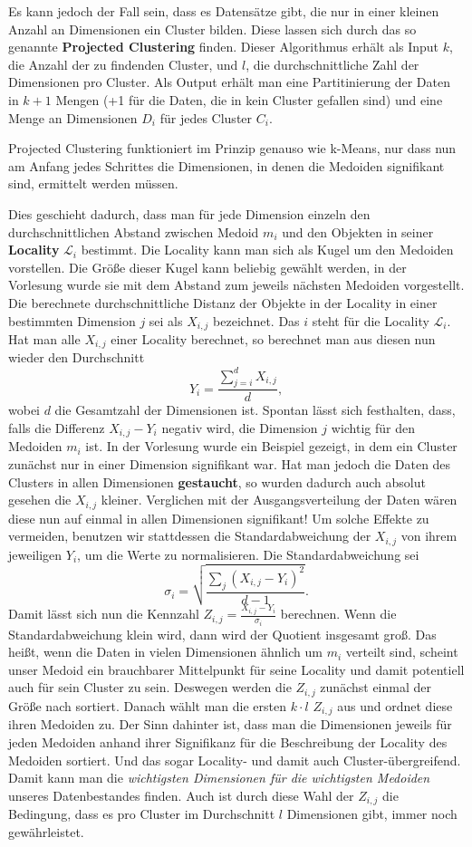 Es kann jedoch der Fall sein, dass es Datensätze gibt, die nur in einer kleinen
Anzahl an Dimensionen ein Cluster bilden. Diese lassen sich durch das so
genannte \textbf{Projected Clustering} finden. Dieser Algorithmus erhält
als Input \(k\), die Anzahl der zu findenden Cluster, und \(l\), die
durchschnittliche Zahl der Dimensionen pro Cluster. Als Output erhält man
eine Partitinierung der Daten in \(k+1\) Mengen (+1 für die Daten, die in
kein Cluster gefallen sind) und eine Menge an Dimensionen \(D_i\) für jedes
Cluster \(C_i\).

Projected Clustering funktioniert im Prinzip genauso wie k-Means, nur dass
nun am Anfang jedes Schrittes die Dimensionen, in denen die Medoiden 
signifikant sind, ermittelt werden müssen. 

Dies geschieht dadurch, dass man
für jede Dimension einzeln den durchschnittlichen Abstand zwischen Medoid
\(m_i\) und den Objekten in seiner \textbf{Locality} \(\mathcal{L}_i\)
bestimmt. Die Locality kann man sich als Kugel um den Medoiden vorstellen.
Die Größe dieser Kugel kann beliebig gewählt werden, in der Vorlesung wurde
sie mit dem Abstand zum jeweils nächsten Medoiden vorgestellt. Die berechnete
durchschnittliche Distanz der Objekte in der Locality
 in einer bestimmten Dimension \(j\) sei als \(X_{i,j}\) bezeichnet.
Das \(i\) steht für die Locality \(\mathcal{L}_i\). Hat man alle \(X_{i,j}\)
einer Locality berechnet, so berechnet man aus diesen nun wieder den 
Durchschnitt \[Y_i = \frac{\sum_{j=i}^d X_{i,j}}{d},\] wobei \(d\) die
Gesamtzahl der Dimensionen ist. Spontan lässt sich festhalten, dass, falls 
die Differenz
\(X_{i,j}-Y_i\) negativ wird, die Dimension \(j\) wichtig für den Medoiden
\(m_i\) ist. In der Vorlesung wurde ein Beispiel gezeigt, in dem ein Cluster
zunächst nur in einer Dimension signifikant war. Hat man jedoch die Daten
des Clusters in allen Dimensionen \textbf{gestaucht}, so wurden dadurch 
auch absolut 
gesehen die \(X_{i,j}\) kleiner. Verglichen mit der Ausgangsverteilung der
Daten wären diese nun auf einmal in allen Dimensionen signifikant! Um solche
Effekte zu vermeiden, benutzen wir stattdessen die Standardabweichung der
\(X_{i,j}\) von ihrem jeweiligen \(Y_i\), um die Werte zu normalisieren.
Die Standardabweichung sei 
\[\sigma_i =\sqrt{\frac{\sum_j (X_{i,j} - Y_i)^2}{d-1}}.\]
Damit lässt sich nun die Kennzahl \(Z_{i,j} = \frac{X_{i,j}-Y_i}{\sigma_i}\) 
berechnen. Wenn die Standardabweichung klein wird, dann wird der Quotient 
insgesamt groß. Das heißt, wenn die Daten in vielen Dimensionen ähnlich um
\(m_i\) verteilt sind, scheint unser Medoid ein brauchbarer Mittelpunkt für
seine Locality und damit potentiell auch für sein Cluster zu sein. Deswegen 
werden die \(Z_{i,j}\) zunächst einmal der Größe nach sortiert. Danach wählt
man die ersten \(k \cdot l\) \(Z_{i,j}\) aus und ordnet diese ihren Medoiden zu.
Der Sinn dahinter ist, dass man die Dimensionen jeweils für jeden Medoiden 
anhand ihrer Signifikanz für die Beschreibung der Locality des Medoiden sortiert.
Und das sogar Locality- und damit auch Cluster-übergreifend. Damit kann man 
die \textit{wichtigsten Dimensionen für die wichtigsten Medoiden} unseres
Datenbestandes finden. Auch ist durch diese Wahl der \(Z_{i,j}\) die 
Bedingung, dass es pro Cluster im Durchschnitt \(l\) Dimensionen gibt,
immer noch gewährleistet.

